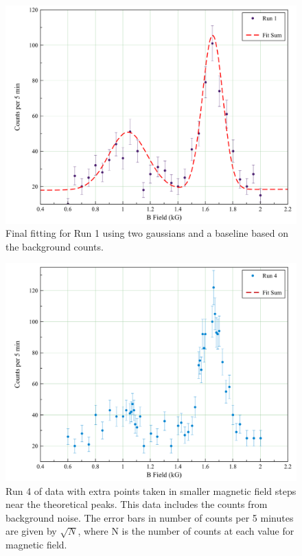 \begin{figure}[H]
\begin{center}
\includegraphics[width=4 in]{run1_err_fit.png}
\caption{Final fitting for Run 1 using two gaussians and a baseline based on the background counts.}
\end{center}
\end{figure}

\begin{figure}[H]
\begin{center}
\includegraphics[width=4 in]{run4_raw.png}
\caption{Run 4 of data with extra points taken in smaller magnetic field steps near the theoretical peaks. This data includes the counts from background noise. The error bars in number of counts per 5 minutes are given by $\sqrt{N}$, where N is the number of counts at each value for magnetic field.}
\end{center}
\end{figure}

